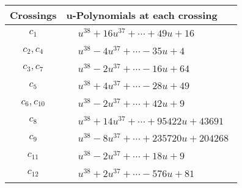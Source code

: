 \documentclass[1p]{elsarticle_modified}
\theoremstyle{definition}
\begin{document}
\begin{tabular}{m{50pt}|m{274pt}}
Crossings & \hspace{64pt}u-Polynomials at each crossing \\
\hline $$\begin{aligned}c_{1}\end{aligned}$$&$\begin{aligned}
&u^{38}+16 u^{37}+\cdots+49 u+16
\end{aligned}$\\
\hline $$\begin{aligned}c_{2},c_{4}\end{aligned}$$&$\begin{aligned}
&u^{38}-4 u^{37}+\cdots-35 u+4
\end{aligned}$\\
\hline $$\begin{aligned}c_{3},c_{7}\end{aligned}$$&$\begin{aligned}
&u^{38}-2 u^{37}+\cdots-16 u+64
\end{aligned}$\\
\hline $$\begin{aligned}c_{5}\end{aligned}$$&$\begin{aligned}
&u^{38}+4 u^{37}+\cdots-28 u+49
\end{aligned}$\\
\hline $$\begin{aligned}c_{6},c_{10}\end{aligned}$$&$\begin{aligned}
&u^{38}-2 u^{37}+\cdots+42 u+9
\end{aligned}$\\
\hline $$\begin{aligned}c_{8}\end{aligned}$$&$\begin{aligned}
&u^{38}+14 u^{37}+\cdots+95422 u+43691
\end{aligned}$\\
\hline $$\begin{aligned}c_{9}\end{aligned}$$&$\begin{aligned}
&u^{38}-8 u^{37}+\cdots+235720 u+204268
\end{aligned}$\\
\hline $$\begin{aligned}c_{11}\end{aligned}$$&$\begin{aligned}
&u^{38}-2 u^{37}+\cdots+18 u+9
\end{aligned}$\\
\hline $$\begin{aligned}c_{12}\end{aligned}$$&$\begin{aligned}
&u^{38}+2 u^{37}+\cdots-576 u+81
\end{aligned}$\\
\hline
\end{tabular}\\~\\
\end{document}
